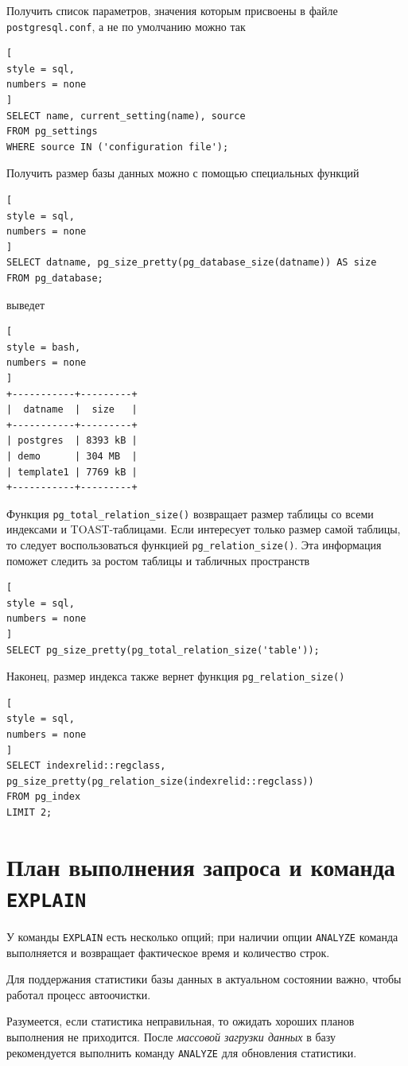 \documentclass[%
	11pt,
	a4paper,
	utf8,
		]{article}
\begin{document}
Получить список параметров, значения которым присвоены в файле \texttt{postgresql.conf}, а не по умолчанию можно так
\begin{lstlisting}[
style = sql,
numbers = none
]
SELECT name, current_setting(name), source
FROM pg_settings
WHERE source IN ('configuration file');
\end{lstlisting}

Получить размер базы данных можно с помощью специальных функций
\begin{lstlisting}[
style = sql,
numbers = none
]
SELECT datname, pg_size_pretty(pg_database_size(datname)) AS size
FROM pg_database;
\end{lstlisting}
выведет
\begin{lstlisting}[
style = bash,
numbers = none
]
+-----------+---------+
|  datname  |  size   |
+-----------+---------+
| postgres  | 8393 kB |
| demo      | 304 MB  |
| template1 | 7769 kB |
+-----------+---------+
\end{lstlisting}

Функция \texttt{pg\_total\_relation\_size()} возвращает размер таблицы со всеми индексами и TOAST-таблицами. Если интересует только размер самой таблицы, то следует воспользоваться функцией \texttt{pg\_relation\_size()}. Эта информация поможет следить за ростом таблицы и табличных пространств
\begin{lstlisting}[
style = sql,
numbers = none
]
SELECT pg_size_pretty(pg_total_relation_size('table'));
\end{lstlisting}

Наконец, размер индекса также вернет функция \texttt{pg\_relation\_size()}
\begin{lstlisting}[
style = sql,
numbers = none
]
SELECT indexrelid::regclass, pg_size_pretty(pg_relation_size(indexrelid::regclass))
FROM pg_index
LIMIT 2;
\end{lstlisting}

\section{План выполнения запроса и команда \texttt{EXPLAIN}}

У команды \texttt{EXPLAIN} есть несколько опций; при наличии опции \texttt{ANALYZE} команда выполняется и возвращает фактическое время и количество строк.

Для поддержания статистики базы данных в актуальном состоянии важно, чтобы работал процесс автоочистки.

Разумеется, если статистика неправильная, то ожидать хороших планов выполнения не приходится. После \emph{массовой загрузки данных} в базу рекомендуется выполнить команду \texttt{ANALYZE} для обновления статистики. 
\end{document}
